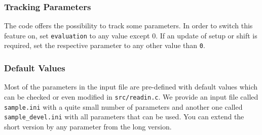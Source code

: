 \documentclass[a4paper,12pt]{scrartcl}
\begin{document}
\subsubsection{Tracking Parameters}
The code offers the possibility to track some parameters. In order to switch this feature on, set \texttt{evaluation} to any value except 0. If an update of setup or shift is required, set the respective parameter to any other value than \texttt{0}.

\subsubsection{Default Values}
Most of the parameters in the input file are pre-defined with default values which can be checked or even modified in \texttt{src/readin.c}. We provide an input file called \texttt{sample.ini} with a quite small number of parameters and another one called \texttt{sample\_devel.ini} with all parameters that can be used. You can extend the short version by any parameter from the long version.
\end{document}
